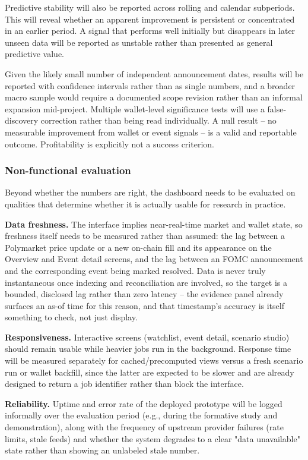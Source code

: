 Predictive stability will also be reported across rolling and calendar subperiods. This will reveal whether an apparent improvement is persistent or concentrated in an earlier period. A signal that performs well initially but disappears in later unseen data will be reported as unstable rather than presented as general predictive value.

Given the likely small number of independent announcement dates, results will be reported with confidence intervals rather than as single numbers, and a broader macro sample would require a documented scope revision rather than an informal expansion mid-project. Multiple wallet-level significance tests will use a false-discovery correction rather than being read individually. A null result -- no measurable improvement from wallet or event signals -- is a valid and reportable outcome. Profitability is explicitly not a success criterion.

\subsubsection{Non-functional evaluation}
Beyond whether the numbers are right, the dashboard needs to be evaluated on qualities that determine whether it is actually usable for research in practice.

\textbf{Data freshness.} The interface implies near-real-time market and wallet state, so freshness itself needs to be measured rather than assumed: the lag between a Polymarket price update or a new on-chain fill and its appearance on the Overview and Event detail screens, and the lag between an FOMC announcement and the corresponding event being marked resolved. Data is never truly instantaneous once indexing and reconciliation are involved, so the target is a bounded, disclosed lag rather than zero latency -- the evidence panel already surfaces an as-of time for this reason, and that timestamp's accuracy is itself something to check, not just display.

\textbf{Responsiveness.} Interactive screens (watchlist, event detail, scenario studio) should remain usable while heavier jobs run in the background. Response time will be measured separately for cached/precomputed views versus a fresh scenario run or wallet backfill, since the latter are expected to be slower and are already designed to return a job identifier rather than block the interface.

\textbf{Reliability.} Uptime and error rate of the deployed prototype will be logged informally over the evaluation period (e.g., during the formative study and demonstration), along with the frequency of upstream provider failures (rate limits, stale feeds) and whether the system degrades to a clear "data unavailable" state rather than showing an unlabeled stale number.

